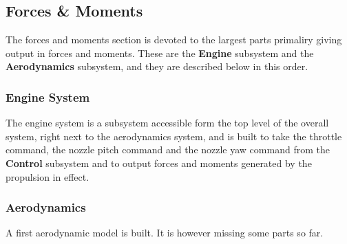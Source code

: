 \subsection{Forces \& Moments}

The forces and moments section is devoted to the largest parts primaliry giving output in forces and moments. These are the \textbf{Engine} subsystem and the \textbf{Aerodynamics} subsystem, and they are described below in this order.

\subsubsection{Engine System}

The engine system is a subsystem accessible form the top level of the overall system, right next to the aerodynamics system, and is built to take the throttle command, the nozzle pitch command and the nozzle yaw command from the \textbf{Control} subsystem and to output forces and moments generated by the propulsion in effect.


\subsubsection{Aerodynamics}

A first aerodynamic model is built. It is however missing some parts so far.


